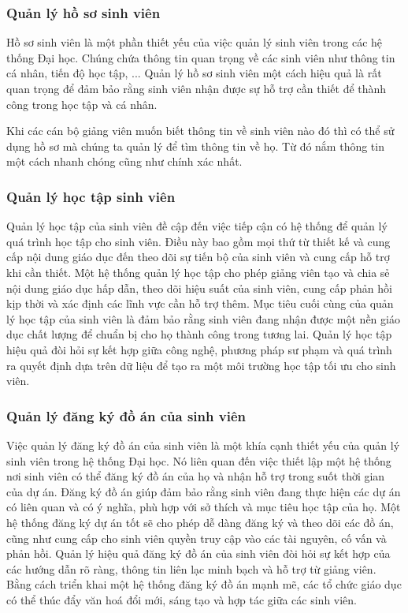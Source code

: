 \subsubsection*{Quản lý hồ sơ sinh viên}
	Hồ sơ sinh viên là một phần thiết yếu của việc quản lý sinh viên trong các hệ thống Đại học. 
	Chúng chứa thông tin quan trọng về các sinh viên như thông tin cá nhân, tiến độ học tập, ... 
	Quản lý hồ sơ sinh viên một cách hiệu quả là rất quan trọng để đảm bảo rằng sinh viên nhận được sự hỗ trợ cần thiết để thành công trong học tập và cá nhân.

	Khi các cán bộ giảng viên muốn biết thông tin về sinh viên nào đó thì có thể sử dụng hồ sơ mà chúng ta quản lý để tìm thông tin về họ.
	Từ đó nắm thông tin một cách nhanh chóng cũng như chính xác nhất. 
\subsubsection*{Quản lý học tập sinh viên}
	Quản lý học tập của sinh viên đề cập đến việc tiếp cận có hệ thống để quản lý quá trình học tập cho sinh viên. 
	Điều này bao gồm mọi thứ từ thiết kế và cung cấp nội dung giáo dục đến theo dõi sự tiến bộ của sinh viên và cung cấp hỗ trợ khi cần thiết.
	Một hệ thống quản lý học tập cho phép giảng viên tạo và chia sẻ nội dung giáo dục hấp dẫn, theo dõi hiệu suất của sinh viên, cung cấp phản hồi kịp thời và xác định các lĩnh vực cần hỗ trợ thêm.
	Mục tiêu cuối cùng của quản lý học tập của sinh viên là đảm bảo rằng sinh viên đang nhận được một nền giáo dục chất lượng để chuẩn bị cho họ thành công trong tương lai.
	Quản lý học tập hiệu quả đòi hỏi sự kết hợp giữa công nghệ, phương pháp sư phạm và quá trình ra quyết định dựa trên dữ liệu để tạo ra một môi trường học tập tối ưu cho sinh viên.
\subsubsection*{Quản lý đăng ký đồ án của sinh viên}
	Việc quản lý đăng ký đồ án của sinh viên là một khía cạnh thiết yếu của quản lý sinh viên trong hệ thống Đại học. Nó liên quan đến việc thiết lập một hệ thống nơi sinh viên có thể đăng ký đồ án của họ và nhận hỗ trợ trong suốt thời gian của dự án.
	Đăng ký đồ án giúp đảm bảo rằng sinh viên đang thực hiện các dự án có liên quan và có ý nghĩa, phù hợp với sở thích và mục tiêu học tập của họ. 
	Một hệ thống đăng ký dự án tốt sẽ cho phép dễ dàng đăng ký và theo dõi các đồ án, cũng như cung cấp cho sinh viên quyền truy cập vào các tài nguyên, cố vấn và phản hồi.
	Quản lý hiệu quả đăng ký đồ án của sinh viên đòi hỏi sự kết hợp của các hướng dẫn rõ ràng, thông tin liên lạc minh bạch và hỗ trợ từ giảng viên. 
	Bằng cách triển khai một hệ thống đăng ký đồ án mạnh mẽ, các tổ chức giáo dục có thể thúc đẩy văn hoá đổi mới, sáng tạo và hợp tác giữa các sinh viên.
